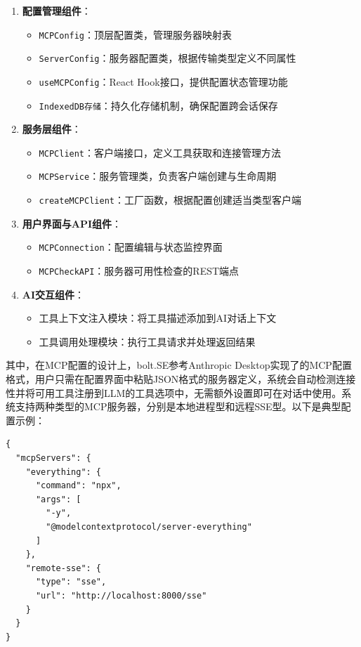 \begin{enumerate}
  \item \textbf{配置管理组件}：
    \begin{itemize}
      \item \texttt{MCPConfig}：顶层配置类，管理服务器映射表
      \item \texttt{ServerConfig}：服务器配置类，根据传输类型定义不同属性
      \item \texttt{useMCPConfig}：React Hook接口，提供配置状态管理功能
      \item \texttt{IndexedDB存储}：持久化存储机制，确保配置跨会话保存
    \end{itemize}
  
  \item \textbf{服务层组件}：
    \begin{itemize}
      \item \texttt{MCPClient}：客户端接口，定义工具获取和连接管理方法
      \item \texttt{MCPService}：服务管理类，负责客户端创建与生命周期
      \item \texttt{createMCPClient}：工厂函数，根据配置创建适当类型客户端
    \end{itemize}
  
  \item \textbf{用户界面与API组件}：
    \begin{itemize}
      \item \texttt{MCPConnection}：配置编辑与状态监控界面
      \item \texttt{MCPCheckAPI}：服务器可用性检查的REST端点
    \end{itemize}
  
  \item \textbf{AI交互组件}：
    \begin{itemize}
      \item 工具上下文注入模块：将工具描述添加到AI对话上下文
      \item 工具调用处理模块：执行工具请求并处理返回结果
    \end{itemize}
\end{enumerate}

其中，在MCP配置的设计上，bolt.SE参考Anthropic Desktop实现了的MCP配置格式，用户只需在配置界面中粘贴JSON格式的服务器定义，系统会自动检测连接性并将可用工具注册到LLM的工具选项中，无需额外设置即可在对话中使用。系统支持两种类型的MCP服务器，分别是本地进程型和远程SSE型。以下是典型配置示例：

\begin{verbatim}
{
  "mcpServers": {
    "everything": {
      "command": "npx",
      "args": [
        "-y",
        "@modelcontextprotocol/server-everything"
      ]
    },
    "remote-sse": {
      "type": "sse",
      "url": "http://localhost:8000/sse"
    }
  }
}
\end{verbatim}

